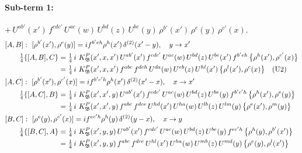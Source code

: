 \documentclass[10pt]{article}
\numberwithin{equation}{section}
\begin{document}
\paragraph{Sub-term 1:} $+\,U^{ab'}(x')\,f^{cdc'}\,U^{ac}(w)\,U^{bd}(z)\,U^{be}(y)\,\rho^{b'}(x')\,\rho^{e}(y)\,\rho^{c'}(x)$.
\begin{align}
&[A,B]:\ [\rho^{b'}(x'),\rho^{e}(y)]=i f^{b'eh}\rho^{h}(x')\,\delta^{(2)}(x'-y),\quad y\to x'\notag\\
&\qquad \tfrac14\{[A,B],C\}=\tfrac14\,i\,\,K^{P}_{\mathfrak B}(x',x,x')\,U^{ab'}(x')\,f^{cdc'}\,U^{ac}(w)\,U^{bd}(z)\,U^{be}(x')\,f^{b'eh}\,\big\{\rho^{h}(x'),\rho^{c'}(x)\big\}\notag\\
&\qquad\phantom{\tfrac14\{[A,B],C\}}=\tfrac14\,i\,\,K^{P}_{\mathfrak B}(x',x,x')\,f^{abc}\,f^{deh}\,U^{da}(w)\,U^{eb}(z)\,U^{hl}(x')\,\big\{\rho^{l}(x'),\rho^{c}(x)\big\}\quad\text{(U2)}
\label{eq:GI.IV.P-1-AB}\\
&[A,C]:\ [\rho^{b'}(x'),\rho^{c'}(x)]=i f^{b'c'h}\rho^{h}(x')\,\delta^{(2)}(x'-x),\quad x\to x'\notag\\
&\qquad \tfrac14\{[A,C],B\}=\tfrac14\,i\,\,K^{P}_{\mathfrak B}(x',x',y)\,U^{ab'}(x')\,f^{cdc'}\,U^{ac}(w)\,U^{bd}(z)\,U^{be}(y)\,f^{b'c'h}\,\big\{\rho^{h}(x'),\rho^{e}(y)\big\}\notag\\
&\qquad\phantom{\tfrac14\{[A,C],B\}}=\tfrac14\,i\,\,K^{P}_{\mathfrak B}(x',x',y)\,f^{abc}\,f^{dce}\,U^{hd}(x')\,U^{ha}(w)\,U^{lb}(z)\,U^{lm}(y)\,\big\{\rho^{e}(x'),\rho^{m}(y)\big\}
\label{eq:GI.IV.P-1-AC}\\
&[B,C]:\ [\rho^{e}(y),\rho^{c'}(x)]=i f^{ec'h}\rho^{h}(y)\,\delta^{(2)}(y-x),\quad x\to y\notag\\
&\qquad \tfrac14\{[B,C],A\}=\tfrac14\,i\,\,K^{P}_{\mathfrak B}(x',y,y)\,U^{ab'}(x')\,f^{cdc'}\,U^{ac}(w)\,U^{bd}(z)\,U^{be}(y)\,f^{ec'h}\,\big\{\rho^{h}(y),\rho^{b'}(x')\big\}\notag\\
&\qquad\phantom{\tfrac14\{[B,C],A\}}=\tfrac14\,i\,\,K^{P}_{\mathfrak B}(x',y,y)\,f^{abc}\,f^{dce}\,U^{hl}(x')\,U^{ha}(w)\,U^{mb}(z)\,U^{md}(y)\,\big\{\rho^{e}(y),\rho^{l}(x')\big\}
\label{eq:GI.IV.P-1-BC}
\end{align}
\end{document}
